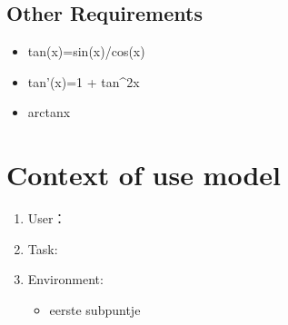 \documentclass[10pt,a4paper,twoside]{article}
\begin{document}
\subsection{Other Requirements}
\begin{enumerate}
\begin{itemize}
\item tan(x)=sin(x)/cos(x)
\item tan'(x)=1 + tan^2x
\item arctanx
\end{itemize} 
\end{enumerate}

\section{Context of use model}

\begin{enumerate}
\item 
User：
\item
Task:
\item
Environment:
\begin{itemize}
\item eerste subpuntje
\end{itemize}
\end{enumerate}
\end{document}
